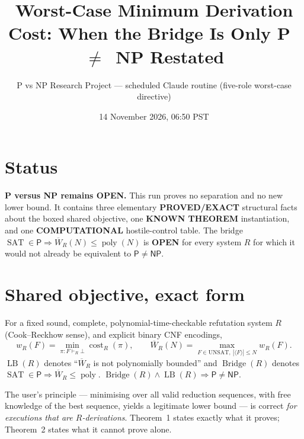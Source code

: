 \documentclass[11pt]{article}
\title{Worst-Case Minimum Derivation Cost: When the Bridge Is Only P~$\neq$~NP Restated}
\author{P vs NP Research Project --- scheduled Claude routine (five-role worst-case directive)}
\date{14 November 2026, 06:50 PST}
\newcommand{\SAT}{\operatorname{SAT}}
\newcommand{\Wbar}{\overline W}
\begin{document}
\maketitle

\section*{Status}
\textbf{P versus NP remains OPEN.} This run proves no separation and no new
lower bound. It contains three elementary \textbf{PROVED/EXACT} structural facts
about the boxed shared objective, one \textbf{KNOWN THEOREM} instantiation, and
one \textbf{COMPUTATIONAL} hostile-control table. The bridge
$\SAT\in\mathsf P\Rightarrow\Wbar_R(N)\le\operatorname{poly}(N)$ is
\textbf{OPEN} for every system $R$ for which it would not already be
equivalent to $\mathsf P\neq\mathsf{NP}$.

\section*{Shared objective, exact form}
For a fixed sound, complete, polynomial-time-checkable refutation system $R$
(Cook--Reckhow sense), and explicit binary CNF encodings,
\[
 w_R(F)=\min_{\pi:F\vdash_R\bot}\operatorname{cost}_R(\pi),\qquad
 \Wbar_R(N)=\max_{F\in\mathrm{UNSAT},\ |\langle F\rangle|\le N} w_R(F).
\]
$\operatorname{LB}(R)$ denotes ``$\Wbar_R$ is not polynomially bounded'' and
$\operatorname{Bridge}(R)$ denotes
$\SAT\in\mathsf P\Rightarrow\Wbar_R\le\operatorname{poly}$.
$\operatorname{Bridge}(R)\wedge\operatorname{LB}(R)\Rightarrow\mathsf P\neq\mathsf{NP}$.

The user's principle --- minimising over all valid reduction sequences, with
free knowledge of the best sequence, yields a legitimate lower bound --- is
correct \emph{for executions that are $R$-derivations}. Theorem~1 states
exactly what it proves; Theorem~2 states what it cannot prove alone.
\end{document}
